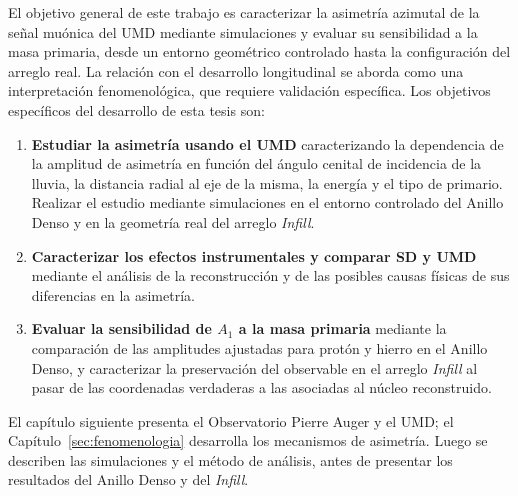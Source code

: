 El objetivo general de este trabajo es caracterizar la asimetría azimutal de la señal muónica del UMD mediante simulaciones y evaluar su sensibilidad a la masa primaria, desde un entorno geométrico controlado hasta la configuración del arreglo real. La relación con el desarrollo longitudinal se aborda como una interpretación fenomenológica, que requiere validación específica. Los objetivos específicos del desarrollo de esta tesis son:

\begin{enumerate}
	\item \textbf{Estudiar la asimetría usando el UMD} caracterizando la dependencia de la amplitud de asimetría en función del ángulo cenital de incidencia de la lluvia, la distancia radial al eje de la misma, la energía y el tipo de primario. Realizar el estudio mediante simulaciones en el entorno controlado del Anillo Denso y en la geometría real del arreglo \textit{Infill}.
	
	\item \textbf{Caracterizar los efectos instrumentales y comparar SD y UMD} mediante el análisis de la reconstrucción y de las posibles causas físicas de sus diferencias en la asimetría.
	
	\item \textbf{Evaluar la sensibilidad de $A_1$ a la masa primaria} mediante la comparación de las amplitudes ajustadas para protón y hierro en el Anillo Denso, y caracterizar la preservación del observable en el arreglo \textit{Infill} al pasar de las coordenadas verdaderas a las asociadas al núcleo reconstruido.
\end{enumerate}

El capítulo siguiente presenta el Observatorio Pierre Auger y el UMD; el Capítulo~\ref{sec:fenomenologia} desarrolla los mecanismos de asimetría. Luego se describen las simulaciones y el método de análisis, antes de presentar los resultados del Anillo Denso y del \textit{Infill}.

\newpage